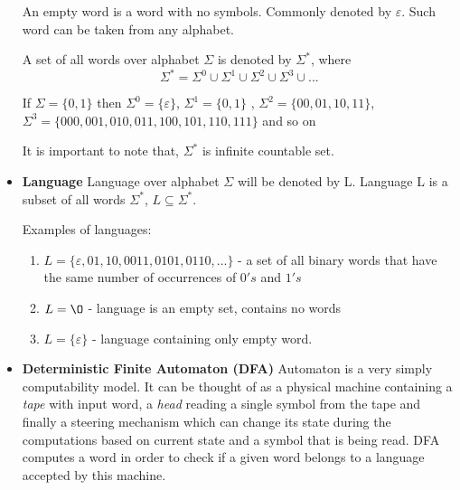 \documentclass{article}
\begin{document}
\begin{itemize}
An empty word is a word with no symbols. Commonly denoted by $\varepsilon$. Such word can be taken from any alphabet.

A set of all words over alphabet $\Sigma$ is denoted by $\Sigma^*$,
where 
\begin{equation}
\Sigma^* = \Sigma^0 \cup \Sigma^1 \cup \Sigma^2 \cup \Sigma^3 \cup ...
\end{equation}

If $\Sigma = \{0,1\}$
then $\Sigma^0 = \{\varepsilon \}$, $\Sigma^1 = \{0,1\}$ , $\Sigma^2 = \{00, 01 ,10 ,11\}$,
$\Sigma^3 = \{000, 001, 010, 011, 100, 101, 110, 111\}$ and so on

It is important to note that, $\Sigma^*$ is infinite countable set.


\item {\bf Language}
Language over alphabet $\Sigma$ will be denoted by L.
Language L is a subset of all words $\Sigma^*$, $L \subseteq \Sigma^*$.

Examples of languages:
\begin{enumerate}

	\item 
	$L = \{\varepsilon, 01, 10, 0011, 0101, 0110, ...\}$ -
	a set of all binary words that have the same number of occurrences of $0's$ 	and $1's$
	
	\item 	$L = \O$ - language is an empty set, contains no words
	
	\item 	$L = \{\varepsilon \}$ - language containing only empty word.

\end{enumerate}



\item {\bf Deterministic Finite Automaton (DFA)}
Automaton is a very simply computability model.
It can be thought of as a physical machine containing a \textit{tape} with input word, a \textit{head} reading a single symbol from the tape and finally a steering mechanism which can change its state during the computations based on current state and a symbol that is being read.
DFA computes a word in order to check if a given word belongs to a language accepted by this machine.


\end{itemize}
\end{document}

